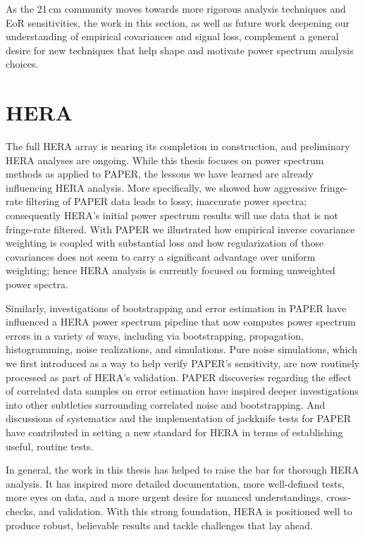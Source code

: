 As the 21\,cm community moves towards more rigorous analysis techniques and EoR sensitivities, the work in this section, as well as future work deepening our understanding of empirical covariances and signal loss, complement a general desire for new techniques that help shape and motivate power spectrum analysis choices.

\section{HERA}

The full HERA array is nearing its completion in construction, and preliminary HERA analyses are ongoing. While this thesis focuses on power spectrum methods as applied to PAPER, the lessons we have learned are already influencing HERA analysis. More specifically, we showed how aggressive fringe-rate filtering of PAPER data leads to lossy, inaccurate power spectra; consequently HERA's initial power spectrum results will use data that is not fringe-rate filtered. With PAPER we illustrated how empirical inverse covariance weighting is coupled with substantial loss and how regularization of those covariances does not seem to carry a significant advantage over uniform weighting; hence HERA analysis is currently focused on forming unweighted power spectra.

Similarly, investigations of bootstrapping and error estimation in PAPER have influenced a HERA power spectrum pipeline that now computes power spectrum errors in a variety of ways, including via bootstrapping, propagation, histogramming, noise realizations, and simulations. Pure noise simulations, which we first introduced as a way to help verify PAPER's sensitivity, are now routinely processed as part of HERA's validation. PAPER discoveries regarding the effect of correlated data samples on error estimation have inspired deeper investigations into other subtleties surrounding correlated noise and bootstrapping. And discussions of systematics and the implementation of jackknife tests for PAPER have contributed in setting a new standard for HERA in terms of establishing useful, routine tests.

In general, the work in this thesis has helped to raise the bar for thorough HERA analysis. It has inspired more detailed documentation, more well-defined tests, more eyes on data, and a more urgent desire for nuanced understandings, cross-checks, and validation. With this strong foundation, HERA is positioned well to produce robust, believable results and tackle challenges that lay ahead. 



